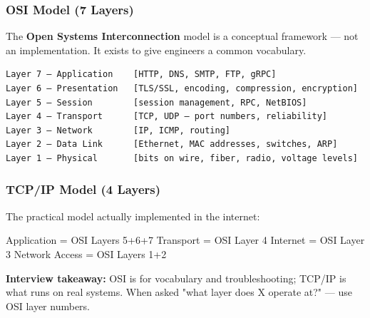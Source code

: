 \documentclass[11pt]{article}
\newenvironment{Shaded}{\begin{snugshade}}{\end{snugshade}}
\newcommand{\DecValTok}[1]{\textcolor[rgb]{0.96,0.45,0.00}{#1}}
\newcommand{\NormalTok}[1]{\textcolor[rgb]{0.81,0.81,0.76}{#1}}
\newcommand{\OperatorTok}[1]{\textcolor[rgb]{0.81,0.81,0.76}{#1}}
\begin{document}

\subsubsection{OSI Model (7 Layers)}\label{osi-model-7-layers}

The \textbf{Open Systems Interconnection} model is a conceptual framework --- not an implementation. It exists to give engineers a common vocabulary.

\setcodelang{}

\begin{verbatim}
Layer 7 — Application    [HTTP, DNS, SMTP, FTP, gRPC]
Layer 6 — Presentation   [TLS/SSL, encoding, compression, encryption]
Layer 5 — Session        [session management, RPC, NetBIOS]
Layer 4 — Transport      [TCP, UDP — port numbers, reliability]
Layer 3 — Network        [IP, ICMP, routing]
Layer 2 — Data Link      [Ethernet, MAC addresses, switches, ARP]
Layer 1 — Physical       [bits on wire, fiber, radio, voltage levels]
\end{verbatim}

\subsubsection{TCP/IP Model (4 Layers)}\label{tcpip-model-4-layers}

The practical model actually implemented in the internet:


\begin{Shaded}
\begin{Highlighting}[]
\NormalTok{Application     }\OperatorTok{=}\NormalTok{ OSI Layers }\DecValTok{5}\OperatorTok{+}\DecValTok{6}\OperatorTok{+}\DecValTok{7}
\NormalTok{Transport       }\OperatorTok{=}\NormalTok{ OSI Layer }\DecValTok{4}
\NormalTok{Internet        }\OperatorTok{=}\NormalTok{ OSI Layer }\DecValTok{3}
\NormalTok{Network Access  }\OperatorTok{=}\NormalTok{ OSI Layers }\DecValTok{1}\OperatorTok{+}\DecValTok{2}
\end{Highlighting}
\end{Shaded}

\textbf{Interview takeaway:} OSI is for vocabulary and troubleshooting; TCP/IP is what runs on real systems. When asked "what layer does X operate at?" --- use OSI layer numbers.
\end{document}
